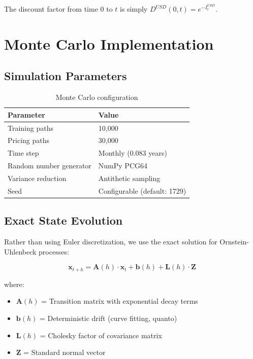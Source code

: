 \documentclass[10pt,a4paper]{article}
\begin{document}
The discount factor from time 0 to $t$ is simply $D^{USD}(0,t) = e^{-I_t^{USD}}$.

\newpage

\section{Monte Carlo Implementation}

\subsection{Simulation Parameters}

\begin{table}[H]
\centering
\begin{tabular}{ll}
\toprule
\textbf{Parameter} & \textbf{Value} \\
\midrule
Training paths & 10,000 \\
Pricing paths & 30,000 \\
Time step & Monthly (0.083 years) \\
Random number generator & NumPy PCG64 \\
Variance reduction & Antithetic sampling \\
Seed & Configurable (default: 1729) \\
\bottomrule
\end{tabular}
\caption{Monte Carlo configuration}
\end{table}

\subsection{Exact State Evolution}

Rather than using Euler discretization, we use the exact solution for Ornstein-Uhlenbeck processes:

\[
\mathbf{x}_{t+h} = \mathbf{A}(h) \cdot \mathbf{x}_t + \mathbf{b}(h) + \mathbf{L}(h) \cdot \mathbf{Z}
\]

where:
\begin{itemize}
    \item $\mathbf{A}(h)$ = Transition matrix with exponential decay terms
    \item $\mathbf{b}(h)$ = Deterministic drift (curve fitting, quanto)
    \item $\mathbf{L}(h)$ = Cholesky factor of covariance matrix
    \item $\mathbf{Z}$ = Standard normal vector
\end{itemize}
\end{document}
